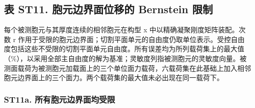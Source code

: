 \documentclass[preprint,12pt,authoryear]{elsarticle}
\begin{document}
\subsection{表 ST11. 胞元边界面位移的 Bernstein 限制}

每个被测胞元与其厚度连续的相邻胞元在构型 x 中以精确凝聚刚度矩阵装配。次数 r 作用于受限的胞元边界面；切割平面单元的自由度仍取单位表示。受控自由度包括这些不受限的切割平面单元自由度。所有误差均为所列载荷集上的最大值（\%），以采用全部主自由度的解为基准；灵敏度列指被测胞元的灵敏度向量。被测面载荷为被测胞元加载面上的三个单位面力载荷，六载荷集在此基础上加入相邻胞元边界面上的三个面力。两个载荷集的最大值未必出现在同一载荷下。

\subsubsection{ST11a. 所有胞元边界面均受限}
\end{document}
